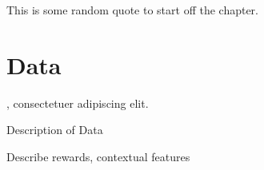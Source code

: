 \begin{savequote}[75mm]
This is some random quote to start off the chapter.
\end{savequote}

\chapter{Data}

, consectetuer adipiscing elit. 


Description of Data

Describe rewards, contextual features